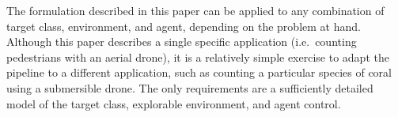 \documentclass[10pt,twocolumn,letterpaper]{article}
\begin{document}
  The formulation described in this paper can be applied to any combination of
  target class, environment, and agent, depending on the problem at hand.
  Although this paper describes a single specific application (i.e.\ counting
  pedestrians with an aerial drone), it is a relatively simple exercise to
  adapt the pipeline to a different application, such as counting a particular
  species of coral using a submersible drone. The only requirements are a
  sufficiently detailed model of the target class, explorable environment, and
  agent control. 


{\small


}
\end{document}
